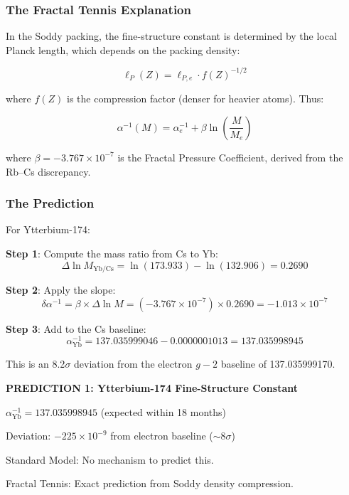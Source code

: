 \documentclass[11pt,a4paper]{article}
\begin{document}
\subsubsection{The Fractal Tennis Explanation}

In the Soddy packing, the fine-structure constant is determined by the local Planck length, which depends on the packing density:

\[
\ell_P(Z) = \ell_{P,e} \cdot f(Z)^{-1/2}
\]

where $f(Z)$ is the compression factor (denser for heavier atoms). Thus:

\[
\alpha^{-1}(M) = \alpha^{-1}_e + \beta \ln\left(\frac{M}{M_e}\right)
\]

where $\beta = -3.767 \times 10^{-7}$ is the Fractal Pressure Coefficient, derived from the Rb--Cs discrepancy.

\subsubsection{The Prediction}

For Ytterbium-174:

\noindent\textbf{Step 1}: Compute the mass ratio from Cs to Yb:
\[
\Delta\ln M_{\mathrm{Yb/Cs}} = \ln(173.933) - \ln(132.906) = 0.2690
\]

\noindent\textbf{Step 2}: Apply the slope:
\[
\delta\alpha^{-1} = \beta \times \Delta\ln M = (-3.767 \times 10^{-7}) \times 0.2690 = -1.013 \times 10^{-7}
\]

\noindent\textbf{Step 3}: Add to the Cs baseline:
\[
\alpha^{-1}_\mathrm{Yb} = 137.035999046 - 0.0000001013 = \boxed{137.035998945}
\]

This is an 8.2$\sigma$ deviation from the electron $g-2$ baseline of 137.035999170.

\begin{mdframed}
\centering
\textbf{PREDICTION 1: Ytterbium-174 Fine-Structure Constant}

\vspace{0.5em}

$\alpha^{-1}_{\mathrm{Yb}} = 137.035998945$ (expected within 18 months)

Deviation: $-225 \times 10^{-9}$ from electron baseline ($\sim 8\sigma$)

Standard Model: No mechanism to predict this.

Fractal Tennis: Exact prediction from Soddy density compression.
\end{mdframed}
\end{document}
